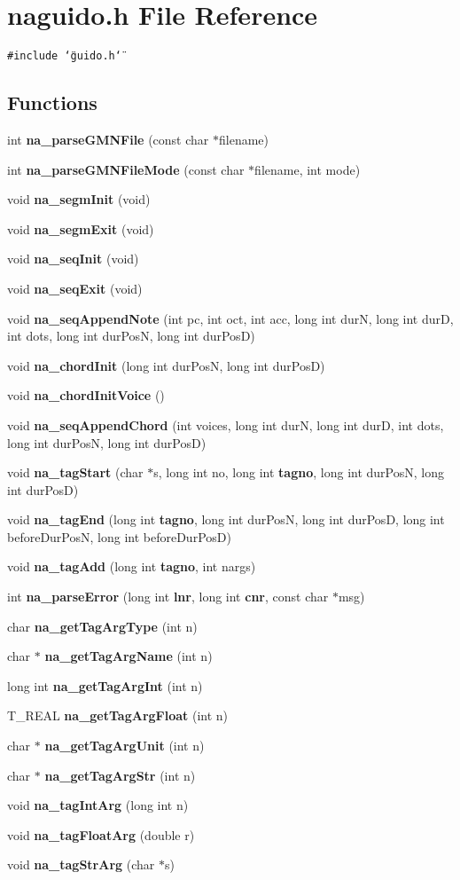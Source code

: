 \section{naguido.h File Reference}
\label{naguido_8h}
{\tt \#include \char`\"{}guido.h\char`\"{}}\par
\subsection*{Functions}
\begin{CompactItemize}
\item 
int {\bf na\_\-parse\-GMNFile} (const char $\ast$filename)
\item 
int {\bf na\_\-parse\-GMNFile\-Mode} (const char $\ast$filename, int mode)
\item 
void {\bf na\_\-segm\-Init} (void)
\item 
void {\bf na\_\-segm\-Exit} (void)
\item 
void {\bf na\_\-seq\-Init} (void)
\item 
void {\bf na\_\-seq\-Exit} (void)
\item 
void {\bf na\_\-seq\-Append\-Note} (int pc, int oct, int acc, long int dur\-N, long int dur\-D, int dots, long int dur\-Pos\-N, long int dur\-Pos\-D)
\item 
void {\bf na\_\-chord\-Init} (long int dur\-Pos\-N, long int dur\-Pos\-D)
\item 
void {\bf na\_\-chord\-Init\-Voice} ()
\item 
void {\bf na\_\-seq\-Append\-Chord} (int voices, long int dur\-N, long int dur\-D, int dots, long int dur\-Pos\-N, long int dur\-Pos\-D)
\item 
void {\bf na\_\-tag\-Start} (char $\ast$s, long int no, long int {\bf tagno}, long int dur\-Pos\-N, long int dur\-Pos\-D)
\item 
void {\bf na\_\-tag\-End} (long int {\bf tagno}, long int dur\-Pos\-N, long int dur\-Pos\-D, long int before\-Dur\-Pos\-N, long int before\-Dur\-Pos\-D)
\item 
void {\bf na\_\-tag\-Add} (long int {\bf tagno}, int nargs)
\item 
int {\bf na\_\-parse\-Error} (long int {\bf lnr}, long int {\bf cnr}, const char $\ast$msg)
\item 
char {\bf na\_\-get\-Tag\-Arg\-Type} (int n)
\item 
char $\ast$ {\bf na\_\-get\-Tag\-Arg\-Name} (int n)
\item 
long int {\bf na\_\-get\-Tag\-Arg\-Int} (int n)
\item 
T\_\-REAL {\bf na\_\-get\-Tag\-Arg\-Float} (int n)
\item 
char $\ast$ {\bf na\_\-get\-Tag\-Arg\-Unit} (int n)
\item 
char $\ast$ {\bf na\_\-get\-Tag\-Arg\-Str} (int n)
\item 
void {\bf na\_\-tag\-Int\-Arg} (long int n)
\item 
void {\bf na\_\-tag\-Float\-Arg} (double r)
\item 
void {\bf na\_\-tag\-Str\-Arg} (char $\ast$s)
\end{CompactItemize}


